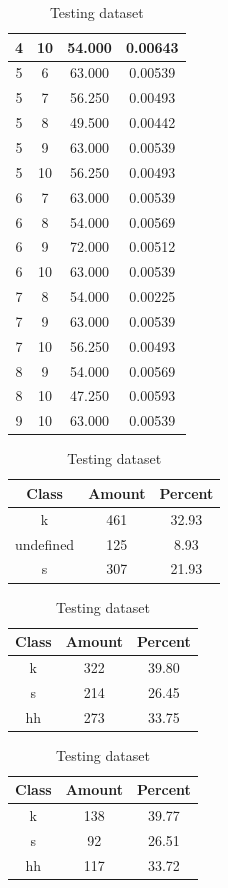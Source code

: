 \begin{table}
\begin{subtable}[h]{0.45\textwidth}
{\begin{tabular}{|c|c|c|c|}
 4 & 10 & 54.000 & 0.00643\\ \hline 
 5 & 6 & 63.000 & 0.00539\\ \hline 
 5 & 7 & 56.250 & 0.00493\\ \hline 
 5 & 8 & 49.500 & 0.00442\\ \hline 
 5 & 9 & 63.000 & 0.00539\\ \hline 
 5 & 10 & 56.250 & 0.00493\\ \hline 
 6 & 7 & 63.000 & 0.00539\\ \hline 
 6 & 8 & 54.000 & 0.00569\\ \hline 
 6 & 9 & 72.000 & 0.00512\\ \hline 
 6 & 10 & 63.000 & 0.00539\\ \hline 
 7 & 8 & 54.000 & 0.00225\\ \hline 
 7 & 9 & 63.000 & 0.00539\\ \hline 
 7 & 10 & 56.250 & 0.00493\\ \hline 
 8 & 9 & 54.000 & 0.00569\\ \hline 
 8 & 10 & 47.250 & 0.00593\\ \hline 
 9 & 10 & 63.000 & 0.00539\\ \hline 

\end{tabular}
}\label{xlsflux2010}
\caption{xcsflux2010}
\end{subtable}

\begin{subtable}[h]{0.45\textwidth}
\centering
\begin{tabular}{|c|c|c|}
\hline
Class & Amount & Percent\\ \hline
k & 461 & 32.93\\ \hline
undefined & 125 & 8.93\\ \hline
s & 307 & 21.93\\ \hline
\end{tabular}
\caption{Entire dataset after stripping short sounds}
\end{subtable}
\hfill
\begin{subtable}[h]{0.45\textwidth}
\centering
\begin{tabular}{|c|c|c|}
\hline
Class & Amount & Percent\\ \hline
k & 322 & 39.80\\ \hline
s & 214 & 26.45\\ \hline
hh & 273 & 33.75\\ \hline
\end{tabular}
\caption{Training dataset}
\end{subtable}
\hfill
\begin{subtable}[h]{0.45\textwidth}
\centering
\begin{tabular}{|c|c|c|}
\hline
Class & Amount & Percent\\ \hline
k & 138 & 39.77\\ \hline
s & 92 & 26.51\\ \hline
hh & 117 & 33.72\\ \hline
\end{tabular}
\caption{Testing dataset}
\end{subtable}
\hfill


\end{table}
